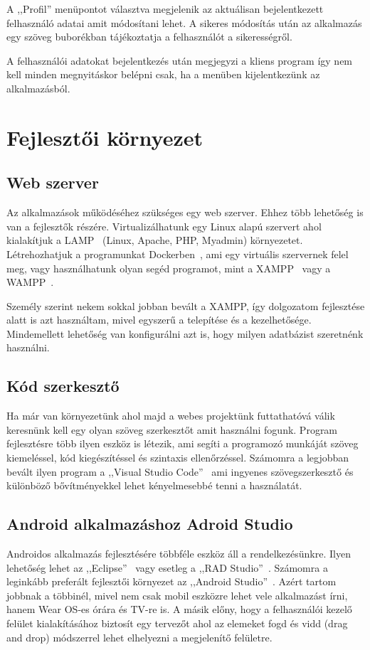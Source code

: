 \documentclass[
]{thesis-ekf}
\theoremstyle{definition}
\theoremstyle{remark}
\begin{document}
A ,,Profil'' menüpontot választva megjelenik az aktuálisan bejelentkezett felhasználó adatai amit módosítani lehet. A sikeres módosítás után az alkalmazás egy szöveg buborékban tájékoztatja a felhasználót a sikerességről. 

A felhasználói adatokat bejelentkezés után megjegyzi a kliens program így nem kell minden megnyitáskor belépni csak, ha a menüben kijelentkezünk az alkalmazásból. 

\chapter{Fejlesztői környezet}
\section{Web szerver}
Az alkalmazások működéséhez szükséges egy web szerver. Ehhez több lehetőség is van a fejlesztők részére. Virtualizálhatunk egy Linux alapú szervert ahol kialakítjuk a LAMP~\cite{lamp_book} (Linux, Apache, PHP, Myadmin) környezetet. Létrehozhatjuk a programunkat Dockerben~\cite{docker_doc}, ami egy virtuális szervernek felel meg, vagy használhatunk olyan segéd programot, mint a XAMPP~\cite{xampp_doc} vagy a WAMPP~\cite{wamp_doc}. 

Személy szerint nekem sokkal jobban bevált a XAMPP, így dolgozatom fejlesztése alatt is azt használtam, mivel egyszerű a telepítése és a kezelhetősége. Mindemellett lehetőség van konfigurálni azt is, hogy milyen adatbázist szeretnénk használni. 

\section{Kód szerkesztő}
Ha már van környezetünk ahol majd a webes projektünk futtathatóvá válik keresnünk kell egy olyan szöveg szerkesztőt amit használni fogunk. Program fejlesztésre több ilyen eszköz is létezik, ami segíti a programozó munkáját szöveg kiemeléssel, kód kiegészítéssel és szintaxis ellenőrzéssel. Számomra a legjobban bevált ilyen program a ,,Visual Studio Code''~\cite{vsc_doc} ami ingyenes szövegszerkesztő és különböző bővítményekkel lehet kényelmesebbé tenni a használatát.

\section{Android alkalmazáshoz Adroid Studio}
Androidos alkalmazás fejlesztésére többféle eszköz áll a rendelkezésünkre. Ilyen lehetőség lehet az ,,Eclipse''~\cite{eclipse_doc} vagy esetleg a ,,RAD Studio''~\cite{rad_doc}. Számomra a leginkább preferált fejlesztői környezet az ,,Android Studio''~\cite{androidStudio_doc}. Azért tartom jobbnak a többinél, mivel nem csak mobil eszközre lehet vele alkalmazást írni, hanem Wear OS-es órára és TV-re is. A másik előny, hogy a felhasználói kezelő felület kialakításához biztosít egy tervezőt ahol az elemeket fogd és vidd (drag and drop) módszerrel lehet elhelyezni a megjelenítő felületre. 
\end{document}
